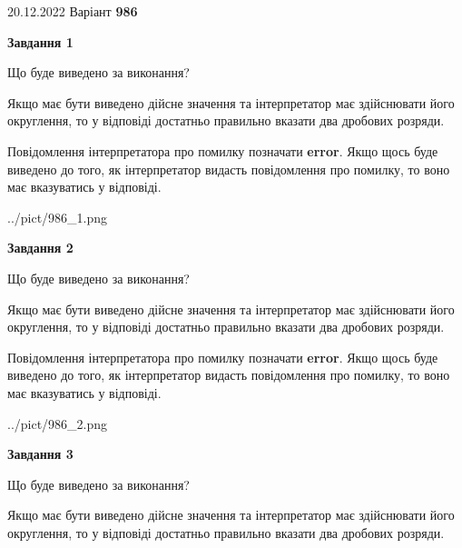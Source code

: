 \documentclass[12pt, ukrainian]{article}
\begin{document}
{20.12.2022 Варіант \No \textbf { 986 }\par}
{
\begin {Large}

{\begin {center}\textbf{Завдання 1}\end {center}}\par
Що буде виведено за виконання? \par

Якщо має бути виведено дійсне значення та інтерпретатор має здійснювати його округлення, 
то у відповіді достатньо правильно вказати два дробових розряди.

Повідомлення інтерпретатора про помилку позначати \textbf{error}.
Якщо щось буде виведено до того, як інтерпретатор видасть повідомлення про помилку, 
то воно має вказуватись у відповіді. \par

\begin{center}
	{../pict/986_1.png}
\end{center}
\newpage

{\begin {center}\textbf{Завдання 2}\end {center}}\par
Що буде виведено за виконання? \par

Якщо має бути виведено дійсне значення та інтерпретатор має здійснювати його округлення, 
то у відповіді достатньо правильно вказати два дробових розряди.

Повідомлення інтерпретатора про помилку позначати \textbf{error}.
Якщо щось буде виведено до того, як інтерпретатор видасть повідомлення про помилку, 
то воно має вказуватись у відповіді. \par

\begin{center}
	{../pict/986_2.png}
\end{center}
\newpage

{\begin {center}\textbf{Завдання 3}\end {center}}\par
Що буде виведено за виконання? \par

Якщо має бути виведено дійсне значення та інтерпретатор має здійснювати його округлення, 
то у відповіді достатньо правильно вказати два дробових розряди.


\end{Large}}
\end{document}

